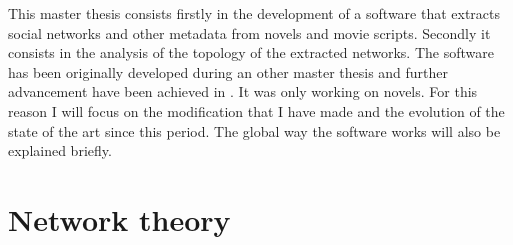 \documentclass[a4paper, 12pt]{report}
\begin{document}
This master thesis consists firstly in the development of a software that extracts social networks and other metadata from novels and movie scripts. Secondly it consists in the analysis of the topology of the extracted networks. The software has been originally developed during an other master thesis \citep{original_thesis} and further advancement have been achieved in \cite{original}. It was only working on novels. For this reason I will focus on the modification that I have made and the evolution of the state of the art since this period. The global way the software works will also be explained briefly. \\


\chapter{Network theory}
\begin{table}
\center
{}
\caption{Example of social networks \citep{SNA_Overview}}\label{SNA_Exemple}
\end{table}
\end{document}

